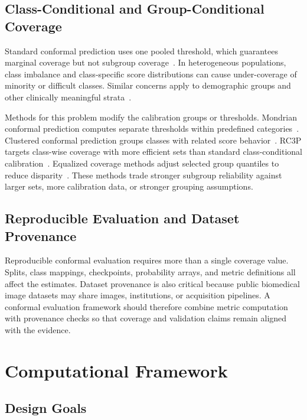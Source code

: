 ﻿\documentclass[preprint,12pt]{elsarticle}
\begin{document}
\subsection{Class-Conditional and Group-Conditional Coverage}

Standard conformal prediction uses one pooled threshold, which guarantees marginal coverage but not subgroup coverage~\cite{barber2021limits}. In heterogeneous populations, class imbalance and class-specific score distributions can cause under-coverage of minority or difficult classes. Similar concerns apply to demographic groups and other clinically meaningful strata~\cite{lu2022fair,zhou2024equalized,bhattacharyya2025conformal}.

Methods for this problem modify the calibration groups or thresholds. Mondrian conformal prediction computes separate thresholds within predefined categories~\cite{vovk2005algorithmic,balasubramanian2014conformal}. Clustered conformal prediction groups classes with related score behavior~\cite{ding2023classconditional}. RC3P targets class-wise coverage with more efficient sets than standard class-conditional calibration~\cite{shi2024rc3p}. Equalized coverage methods adjust selected group quantiles to reduce disparity~\cite{zhou2024equalized}. These methods trade stronger subgroup reliability against larger sets, more calibration data, or stronger grouping assumptions.

\subsection{Reproducible Evaluation and Dataset Provenance}

Reproducible conformal evaluation requires more than a single coverage value. Splits, class mappings, checkpoints, probability arrays, and metric definitions all affect the estimates. Dataset provenance is also critical because public biomedical image datasets may share images, institutions, or acquisition pipelines. A conformal evaluation framework should therefore combine metric computation with provenance checks so that coverage and validation claims remain aligned with the evidence.

\section{Computational Framework}
\label{sec-framework}

\subsection{Design Goals}
\end{document}
